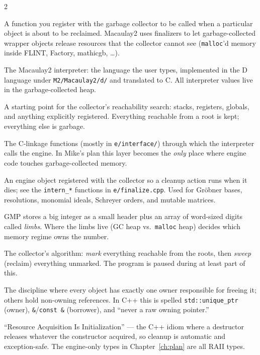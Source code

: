 \documentclass[11pt,oneside]{report}
\newcommand{\code}[1]{\textcolor{m2code}{\texttt{#1}}}
\newcommand{\file}[1]{\textcolor{m2file}{\texttt{#1}}}
\begin{document}
\begin{multicols}{2}
\begin{description}[style=nextline,itemsep=3pt]
\item[Finalizer] A function you register with the garbage collector to be
called when a particular object is about to be reclaimed. Macaulay2 uses
finalizers to let garbage-collected wrapper objects release resources that the
collector cannot see (\code{malloc}'d memory inside FLINT, Factory,
mathicgb, \ldots).

\item[Front end] The Macaulay2 interpreter: the language the user types,
implemented in the D language under \file{M2/Macaulay2/d/} and translated to C.
All interpreter values live in the garbage-collected heap.

\item[GC root] A starting point for the collector's reachability search:
stacks, registers, globals, and anything explicitly registered. Everything
reachable from a root is kept; everything else is garbage.

\item[Interface layer] The C-linkage functions (mostly in
\file{e/interface/}) through which the interpreter calls the engine. In
Mike's plan this layer becomes the \emph{only} place where engine code
touches garbage-collected memory.

\item[Interned object] An engine object registered with the collector so a
cleanup action runs when it dies; see the \code{intern\_*} functions in
\file{e/finalize.cpp}. Used for Gr\"obner bases, resolutions, monomial
ideals, Schreyer orders, and mutable matrices.

\item[Limbs (GMP)] GMP stores a big integer as a small header plus an array of
word-sized digits called \emph{limbs}. Where the limbs live (GC heap vs.\
\code{malloc} heap) decides which memory regime owns the number.

\item[Mark-and-sweep] The collector's algorithm: \emph{mark} everything
reachable from the roots, then \emph{sweep} (reclaim) everything unmarked. The
program is paused during at least part of this.

\item[Ownership (Rust-style)] The discipline where every object has exactly one
owner responsible for freeing it; others hold non-owning references. In C++
this is spelled \code{std::unique\_ptr} (owner), \code{\&}/\code{const \&}
(borrower), and ``never a raw owning pointer.''

\item[RAII] ``Resource Acquisition Is Initialization'' --- the C++ idiom where
a destructor releases whatever the constructor acquired, so cleanup is
automatic and exception-safe. The engine-only types in Chapter~\ref{ch:plan}
are all RAII types.


\end{description}
\end{multicols}
\end{document}
